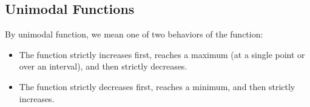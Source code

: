 \subsection{Unimodal Functions}

By unimodal function, we mean one of two behaviors of the function:

\begin{itemize}
  \item The function strictly increases first, reaches a maximum (at a single point or over an interval), and then strictly decreases.
  \item The function strictly decreases first, reaches a minimum, and then strictly increases.
\end{itemize}

\begin{figure}[H]
    \centering
\end{figure}

